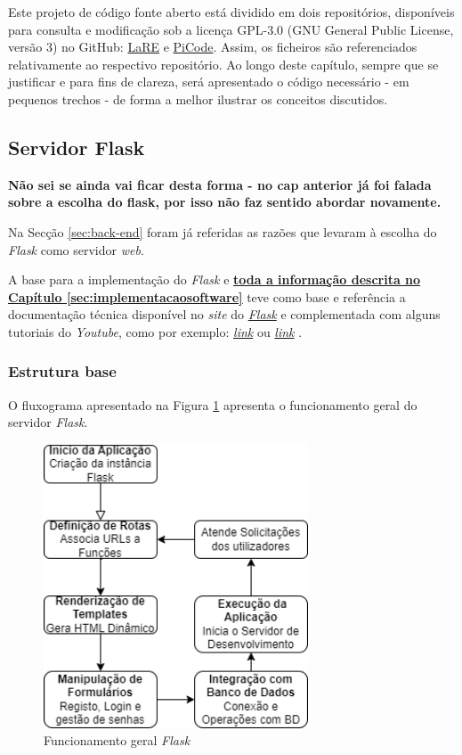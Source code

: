 Este projeto de código fonte aberto está dividido em dois repositórios, disponíveis para consulta e modificação sob a licença GPL-3.0 (GNU General Public License, versão 3) no GitHub: \href{https://github.com/eddygrinder/LaRE}{LaRE} e \href{https://github.com/eddygrinder/LaRE_PICode}{PiCode}. Assim, os ficheiros são referenciados relativamente ao respectivo repositório. Ao longo deste capítulo, sempre que se justificar e para fins de clareza, será apresentado o código necessário - em pequenos trechos - de forma a melhor ilustrar os conceitos discutidos.

\subsection{Servidor Flask}
\label{sec:flask}
\textbf{Não sei se ainda vai ficar desta forma - no cap anterior já foi falada sobre a escolha do flask, por isso não faz sentido abordar novamente.}

Na Secção \ref{sec:back-end} foram já referidas as razões que levaram à escolha do \textit{Flask} como servidor \textit{web}. 

A base para a implementação do \textit{Flask} e \underline{\textbf{toda a informação descrita no}} \underline{\textbf{Capítulo \ref{sec:implementacaosoftware}}} teve como base e referência a documentação técnica disponível no \textit{site} do \href{https://flask.palletsprojects.com/en/3.0.x/}{\textit{Flask}} e complementada com alguns tutoriais do \textit{Youtube}, como por exemplo: \href{https://www.youtube.com/watch?v=dam0GPOAvVI}{\textit{link}} ou \href{https://www.youtube.com/watch?v=bB6Yyh7nUl4}{\textit{link}} .

\subsubsection{Estrutura base}
O fluxograma apresentado na Figura \ref{fig:funcflask} apresenta o funcionamento geral do servidor \textit{Flask}.

\begin{figure}[hbtp]
	\centering
	\includegraphics[width=0.7\textwidth]{figures/fluxograma_flask.drawio.png}
	\caption{Funcionamento geral \textit{Flask}}
	\label{fig:funcflask}
\end{figure}

